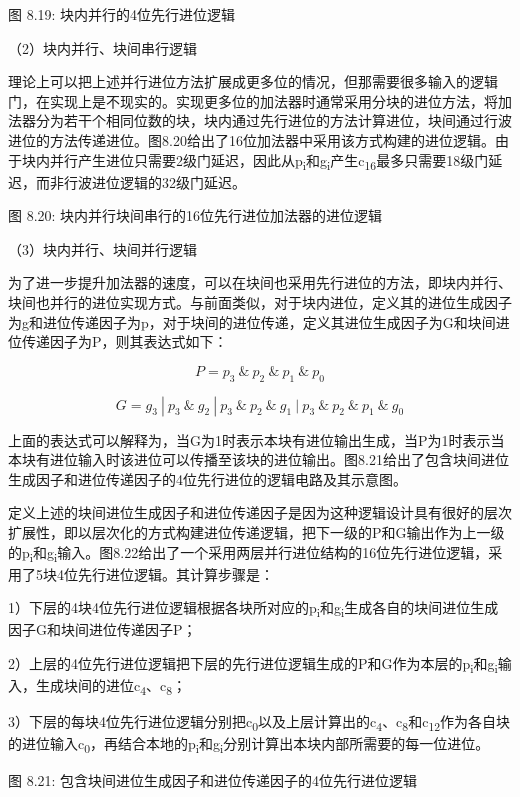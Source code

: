 \documentclass[]{ctexbook}
\begin{document}
图 8.19: 块内并行的4位先行进位逻辑

（2）块内并行、块间串行逻辑

理论上可以把上述并行进位方法扩展成更多位的情况，但那需要很多输入的逻辑门，在实现上是不现实的。实现更多位的加法器时通常采用分块的进位方法，将加法器分为若干个相同位数的块，块内通过先行进位的方法计算进位，块间通过行波进位的方法传递进位。图8.20给出了16位加法器中采用该方式构建的进位逻辑。由于块内并行产生进位只需要2级门延迟，因此从p\textsubscript{i}和g\textsubscript{i}产生c\textsubscript{16}最多只需要18级门延迟，而非行波进位逻辑的32级门延迟。

图 8.20: 块内并行块间串行的16位先行进位加法器的进位逻辑

（3）块内并行、块间并行逻辑

为了进一步提升加法器的速度，可以在块间也采用先行进位的方法，即块内并行、块间也并行的进位实现方式。与前面类似，对于块内进位，定义其的进位生成因子为g和进位传递因子为p，对于块间的进位传递，定义其进位生成因子为G和块间进位传递因子为P，则其表达式如下：

\[P= p_{3}\ \&\ p_{2}\ \&\ p_{1}\ \&\ p_{0}\]

\[G= g_{3}\ |\ p_{3}\ \&\ g_{2}\ |\ p_{3}\ \&\ p_{2}\ \&\ g_{1}\ |\ p_{3}\ \&\ p_{2}\ \&\ p_{1}\ \&\ g_{0}\]

上面的表达式可以解释为，当G为1时表示本块有进位输出生成，当P为1时表示当本块有进位输入时该进位可以传播至该块的进位输出。图8.21给出了包含块间进位生成因子和进位传递因子的4位先行进位的逻辑电路及其示意图。

定义上述的块间进位生成因子和进位传递因子是因为这种逻辑设计具有很好的层次扩展性，即以层次化的方式构建进位传递逻辑，把下一级的P和G输出作为上一级的p\textsubscript{i}和g\textsubscript{i}输入。图8.22给出了一个采用两层并行进位结构的16位先行进位逻辑，采用了5块4位先行进位逻辑。其计算步骤是：

1）下层的4块4位先行进位逻辑根据各块所对应的p\textsubscript{i}和g\textsubscript{i}生成各自的块间进位生成因子G和块间进位传递因子P；

2）上层的4位先行进位逻辑把下层的先行进位逻辑生成的P和G作为本层的p\textsubscript{i}和g\textsubscript{i}输入，生成块间的进位c\textsubscript{4}、c\textsubscript{8}；

3）下层的每块4位先行进位逻辑分别把c\textsubscript{0}以及上层计算出的c\textsubscript{4}、c\textsubscript{8}和c\textsubscript{12}作为各自块的进位输入c\textsubscript{0}，再结合本地的p\textsubscript{i}和g\textsubscript{i}分别计算出本块内部所需要的每一位进位。

图 8.21: 包含块间进位生成因子和进位传递因子的4位先行进位逻辑
\end{document}

